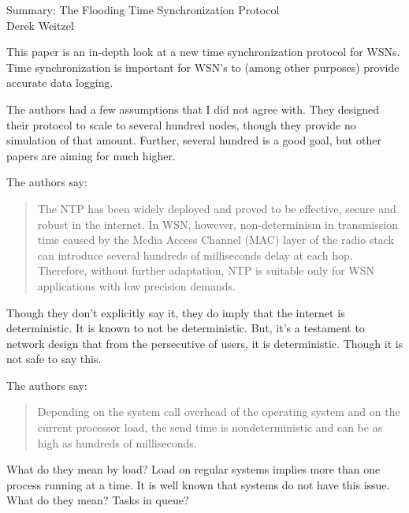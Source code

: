 \documentclass[12pt]{article}
\begin{document}
\begin{center}
{\huge Summary:  The Flooding Time Synchronization Protocol} \\
Derek Weitzel
\end{center}

This paper is an in-depth look at a new time synchronization protocol for WSNs.  Time synchronization is important for WSN's to (among other purposes) provide accurate data logging.

The authors had a few assumptions that I did not agree with.  They designed their protocol to scale to several hundred nodes, though they provide no simulation of that amount.  Further, several hundred is a good goal, but other papers are aiming for much higher.

The authors say:
\begin{quote}
The NTP has been widely deployed and proved to be effective, secure and robust in the internet. In WSN, however, non-determinism in transmission time caused by the Media Access Channel (MAC) layer of the radio stack can introduce several hundreds of milliseconds delay at each hop. Therefore, without further adaptation, NTP is suitable only for WSN applications with low precision demands.
\end{quote}
Though they don't explicitly say it, they do imply that the internet is deterministic.  It is known to not be deterministic.  But, it's a testament to network design that from the persecutive of users, it is deterministic.  Though it is not safe to say this.

The authors say:
\begin{quote}
Depending on the system call overhead of the operating system and on the current processor load, the send time is nondeterministic and can be as high as hundreds of milliseconds.
\end{quote}
What do they mean by load?  Load on regular systems implies more than one process running at a time.  It is well known that systems do not have this issue.  What do they mean?  Tasks in queue?
\end{document}
